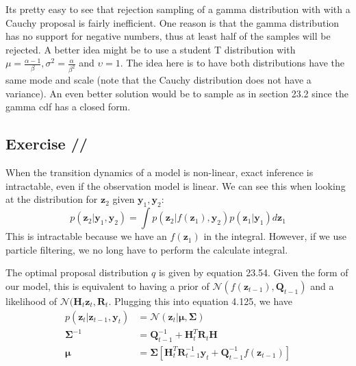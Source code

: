 \documentclass[a4paper,11pt]{article}
\newcounter{exercise}
\newcounter{subexercise}
\newcommand*{\exercise}[1][]{
  \subsection*{Exercise
    \ifx/#1/\stepcounter{exercise}\arabic{exercise}
    \else#1\fi
  }
  \setcounter{subexercise}{0}
}
\begin{document}
  Its pretty easy to see that rejection sampling of a gamma distribution with with a Cauchy
  proposal is fairly inefficient. One reason is that the gamma distribution has no support for
  negative numbers, thus at least half of the samples will be rejected. A better idea might
  be to use a student T distribution with $\mu = \frac{\alpha-1}\beta, \sigma^2 = \frac{\alpha}{\beta^2}$
  and $\upsilon=1$. The idea here is to have both distributions have the same mode and scale (note
  that the Cauchy distribution does not have a variance). An even better solution would be to sample
  as in section 23.2 since the gamma cdf has a closed form.

  \exercise
  When the transition dynamics of a model is non-linear, exact inference is intractable, even if
  the observation model is linear. We can see this when looking at the distribution for
  $\mathbf{z}_2$ given $\mathbf{y}_1, \mathbf{y}_2$:
  \[
    p(\mathbf{z}_2| \mathbf{y}_1, \mathbf{y}_2) =
    \int p(\mathbf{z}_2| f(\mathbf{z}_1), \mathbf{y}_2) p(\mathbf{z}_1| \mathbf{y}_1) d \mathbf{z}_1
  \]
  This is intractable because we have an $f(\mathbf{z}_1)$ in the integral. However, if we use
  particle filtering, we no long have to perform the calculate integral.

  The optimal proposal distribution $q$ is given by equation 23.54. Given the form of our model,
  this is equivalent to having a prior of $\mathcal{N}(f(\mathbf{z}_{t-1}), \mathbf{Q}_{t-1})$ and
  a likelihood of $\mathcal{N}(\mathbf{H}_t \mathbf{z}_t, \mathbf{R}_t$. Plugging this into
  equation 4.125, we have
  \begin{align*}
    p(\mathbf{z}_t|\mathbf{z}_{t-1}, \mathbf{y}_{t})
    &= \mathcal{N}(\mathbf{z}_t| \boldsymbol{\mu}, \boldsymbol{\Sigma}) \\
    \boldsymbol{\Sigma}^{-1} &= \mathbf{Q}_{t-1}^{-1} + \mathbf{H}_t^T \mathbf{R}_t \mathbf{H} \\
    \boldsymbol{\mu}
    &= \boldsymbol{\Sigma}\left[
      \mathbf{H}_t^T \mathbf{R}_{t-1}^{-1} \mathbf{y}_t + \mathbf{Q}_{t-1}^{-1}f(\mathbf{z}_{t-1})
    \right]
  \end{align*}
\end{document}
